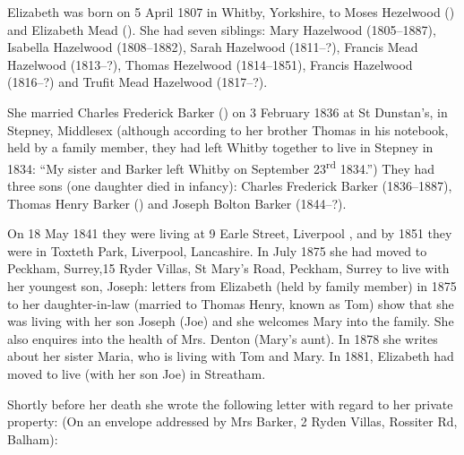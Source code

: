 
Elizabeth was born on 5 April 1807 \cite{ElizabethHazelwoodBirth} in Whitby, Yorkshire, to  Moses Hezelwood () and Elizabeth Mead ().  She had seven siblings: Mary Hazelwood (1805--1887), Isabella Hazelwood (1808--1882), Sarah Hazelwood (1811--?), Francis Mead Hazelwood (1813--?), Thomas Hezelwood (1814--1851), Francis Hazelwood (1816--?) and Trufit Mead Hazelwood (1817--?). 

She married Charles Frederick Barker () on 3 February 1836 at St Dunstan's, in Stepney, Middlesex \cite{ElizabethHazelwoodMarriage} (although according to her brother Thomas in his notebook, held by a family member, they had left Whitby together to live in Stepney in 1834: ``My sister and Barker left Whitby on September 23\textsuperscript{rd} 1834.'')  They had three sons (one daughter died in infancy):  Charles Frederick Barker (1836--1887), Thomas Henry Barker () and Joseph Bolton Barker (1844--?).

On 18 May 1841 they were living at 9 Earle Street, Liverpool \cite{ElizabethHazelwoodResidence}, and by 1851 they were in Toxteth Park, Liverpool, Lancashire. In July 1875 she had moved to	Peckham, Surrey,15 Ryder Villas, St Mary's Road, Peckham, Surrey to live with her youngest son, Joseph: letters from Elizabeth (held by family member) in 1875 to her daughter-in-law (married to Thomas Henry, known as Tom) show that she was living with her son Joseph (Joe) and she welcomes Mary into the family. She also enquires into the health of Mrs. Denton (Mary's aunt). In 1878 she writes about her sister Maria, who is living with Tom and Mary. In 1881, Elizabeth had moved to live (with her son Joe) in Streatham. 

Shortly before her death she wrote the following letter with regard to her private property: (On an envelope addressed by Mrs Barker, 2 Ryden Villas, Rossiter Rd, Balham):

